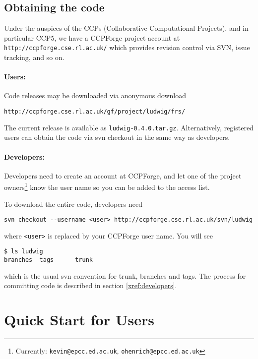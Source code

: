 \subsection{Obtaining the code}

Under the auspices of the CCPs (Collaborative Computational Projects),
and in particular CCP5, we have a CCPForge project account at
\texttt{http://ccpforge.cse.rl.ac.uk/}
which provides revision control via SVN, issue tracking, and so on.

\paragraph{Users:}

Code releases may be downloaded via anonymous download
\begin{lstlisting}[style=terminalverbatim]
http://ccpforge.cse.rl.ac.uk/gf/project/ludwig/frs/
\end{lstlisting}
The current release is available as \texttt{ludwig-0.4.0.tar.gz}.
Alternatively, registered users can obtain the code via svn checkout
in the same way as developers.


\paragraph{Developers:}

Developers need to create an account at CCPForge, and let one of the
project owners\footnote{Currently: \texttt{kevin@epcc.ed.ac.uk},
\texttt{ohenrich@epcc.ed.ac.uk}}
know the user name so you can be added to the access list.

To download the entire code, developers need
\begin{lstlisting}
svn checkout --username <user> http://ccpforge.cse.rl.ac.uk/svn/ludwig
\end{lstlisting}
where \texttt{<user>} is replaced by your CCPForge user name. You will
see
\begin{lstlisting}
$ ls ludwig
branches  tags      trunk
\end{lstlisting}
which is the usual svn convention for trunk, branches and tags.
The process for committing code is described in section \ref{xref:developers}.

\vfill
\pagebreak

\section{Quick Start for Users}

